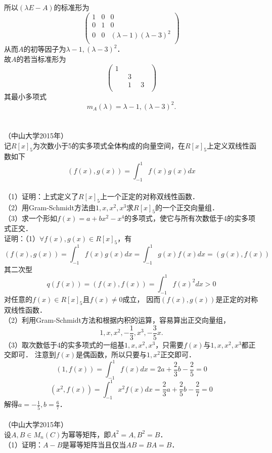 \documentclass{article}
\begin{document}
所以$(\lambda E-A)$的标准形为
$$
    \left(
    \begin{matrix}
            1 & 0 & 0                        \\
            0 & 1 & 0                        \\
            0 & 0 & (\lambda-1)(\lambda-3)^2 \\
        \end{matrix}
    \right)
$$
从而$A$的初等因子为$\lambda-1,(\lambda-3)^2$．
\\ 故$A$的若当标准形为
$$
    \left(
    \begin{matrix}
            1     & \quad & \quad \\
            \quad & 3     & \quad \\
            \quad & 1     & 3     \\
        \end{matrix}
    \right)
$$
其最小多项式
$$m_A(\lambda)=\lambda-1,(\lambda-3)^2.$$
\\ \\ （中山大学2015年）
\\ 记$R[x]_5$为次数小于5的实多项式全体构成的向量空间，在$R[x]_5$上定义双线性函数如下
$$(f(x),g(x))=\int_{-1}^1f(x)g(x)dx$$
\\ （1）证明：上式定义了$R[x]_5$上一个正定的对称双线性函数．
\\ （2）用Gram-Schmidt方法由$1,x,x^2,x^3$求$R[x]_5$的一个正交向量组．
\\ （3）求一个形如$f(x)=a+bx^2-x^4$的多项式，使它与所有次数低于4的实多项式正交．
\\ 证明：（1）$\forall f(x),g(x)\in R[x]_5$，有
$$(f(x),g(x))=\int_{-1}^1f(x)g(x)dx=\int_{-1}^1g(x)f(x)dx=(g(x),f(x))$$
其二次型
$$q(f(x))=(f(x),f(x))=\int_{-1}^1f(x)^2 dx>0$$
对任意的$f(x)\in R[x]_5$且$f(x)\neq0$成立，
因而$(f(x),g(x))$是正定的对称双线性函数．
\\ （2）利用Gram-Schmidt方法和根据内积的运算，容易算出正交向量组，
$$1,x,x^2,-\frac{1}{3},x^3,-\frac{3}{5}x.$$
（3）取次数低于4的实多项式的一组基$1,x,x^2,x^3$，只需要$f(x)$与$1,x,x^2,x^3$都正交即可．
注意到$f(x)$是偶函数，所以只要与$1,x^2$正交即可．
$$(1,f(x))=\int_{-1}^1f(x)dx=2a+\frac{2}{3}b-\frac{2}{5}=0$$
$$(x^2,f(x))=\int_{-1}^1x^2f(x)dx=\frac{2}{3}a+\frac{2}{5}b-\frac{2}{7}=0$$
解得$a=-\frac{1}{5},b=\frac{6}{7}$．
\\ \\ （中山大学2015年）
\\ 设$A,B\in M_n(C)$为幂等矩阵，即$A^2=A,B^2=B$．
\\ （1）证明：$A-B$是幂等矩阵当且仅当$AB=BA=B$．
\end{document}
